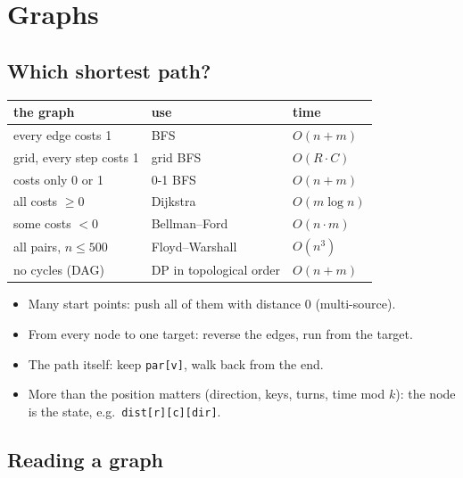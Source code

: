 \section{Graphs}

\subsection{Which shortest path?}\label{t:sp}
\begin{tabularx}{\linewidth}{@{}Xll@{}}
\toprule
the graph & use & time\\
\midrule
every edge costs 1 & BFS & $O(n+m)$\\
grid, every step costs 1 & grid BFS & $O(R \cdot C)$\\
costs only 0 or 1 & 0-1 BFS & $O(n+m)$\\
all costs $\ge 0$ & Dijkstra & $O(m \log n)$\\
some costs $< 0$ & Bellman--Ford & $O(n \cdot m)$\\
all pairs, $n \le 500$ & Floyd--Warshall & $O(n^3)$\\
no cycles (DAG) & DP in topological order & $O(n+m)$\\
\bottomrule
\end{tabularx}
\begin{tip}
\begin{itemize}
\item Many start points: push all of them with distance 0 (multi-source).
\item From every node to one target: reverse the edges, run from the target.
\item The path itself: keep \texttt{par[v]}, walk back from the end.
\item More than the position matters (direction, keys, turns, time mod $k$):
  the node is the state, e.g.\ \texttt{dist[r][c][dir]}.
\end{itemize}
\end{tip}

\subsection{Reading a graph}

\label{t:bfs}

\label{t:gridbfs}

